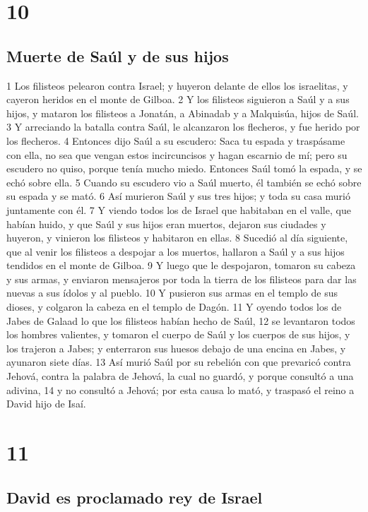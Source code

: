 \chapter{10}

\section*{Muerte de Saúl y de sus hijos}

1 Los filisteos pelearon contra Israel; y huyeron delante de ellos los israelitas, y cayeron heridos en el monte de Gilboa.
2 Y los filisteos siguieron a Saúl y a sus hijos, y mataron los filisteos a Jonatán, a Abinadab y a Malquisúa, hijos de Saúl.
3 Y arreciando la batalla contra Saúl, le alcanzaron los flecheros, y fue herido por los flecheros.
4 Entonces dijo Saúl a su escudero: Saca tu espada y traspásame con ella, no sea que vengan estos incircuncisos y hagan escarnio de mí; pero su escudero no quiso, porque tenía mucho miedo. Entonces Saúl tomó la espada, y se echó sobre ella.
5 Cuando su escudero vio a Saúl muerto, él también se echó sobre su espada y se mató.
6 Así murieron Saúl y sus tres hijos; y toda su casa murió juntamente con él.
7 Y viendo todos los de Israel que habitaban en el valle, que habían huido, y que Saúl y sus hijos eran muertos, dejaron sus ciudades y huyeron, y vinieron los filisteos y habitaron en ellas.
8 Sucedió al día siguiente, que al venir los filisteos a despojar a los muertos, hallaron a Saúl y a sus hijos tendidos en el monte de Gilboa.
9 Y luego que le despojaron, tomaron su cabeza y sus armas, y enviaron mensajeros por toda la tierra de los filisteos para dar las nuevas a sus ídolos y al pueblo.
10 Y pusieron sus armas en el templo de sus dioses, y colgaron la cabeza en el templo de Dagón.
11 Y oyendo todos los de Jabes de Galaad lo que los filisteos habían hecho de Saúl,
12 se levantaron todos los hombres valientes, y tomaron el cuerpo de Saúl y los cuerpos de sus hijos, y los trajeron a Jabes; y enterraron sus huesos debajo de una encina en Jabes, y ayunaron siete días.
13 Así murió Saúl por su rebelión con que prevaricó contra Jehová, contra la palabra de Jehová, la cual no guardó, y porque consultó a una adivina, 
14 y no consultó a Jehová; por esta causa lo mató, y traspasó el reino a David hijo de Isaí.

\chapter{11}

\section*{David es proclamado rey de Israel}

